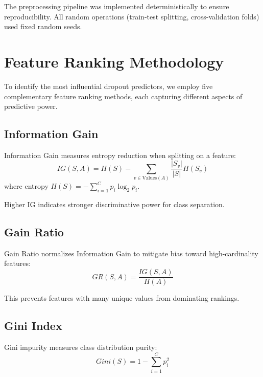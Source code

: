 \documentclass[journal]{IEEEtran}
\begin{document}
The preprocessing pipeline was implemented deterministically to ensure reproducibility. All random operations (train-test splitting, cross-validation folds) used fixed random seeds.

\section{Feature Ranking Methodology}

To identify the most influential dropout predictors, we employ five complementary feature ranking methods, each capturing different aspects of predictive power.

\subsection{Information Gain}

Information Gain measures entropy reduction when splitting on a feature:
\begin{equation}
IG(S, A) = H(S) - \sum_{v \in \text{Values}(A)} \frac{|S_v|}{|S|} H(S_v)
\end{equation}
where entropy $H(S) = -\sum_{i=1}^{C} p_i \log_2 p_i$.

Higher IG indicates stronger discriminative power for class separation.

\subsection{Gain Ratio}

Gain Ratio normalizes Information Gain to mitigate bias toward high-cardinality features:
\begin{equation}
GR(S, A) = \frac{IG(S, A)}{H(A)}
\end{equation}

This prevents features with many unique values from dominating rankings.

\subsection{Gini Index}

Gini impurity measures class distribution purity:
\begin{equation}
Gini(S) = 1 - \sum_{i=1}^{C} p_i^2
\end{equation}
\end{document}
